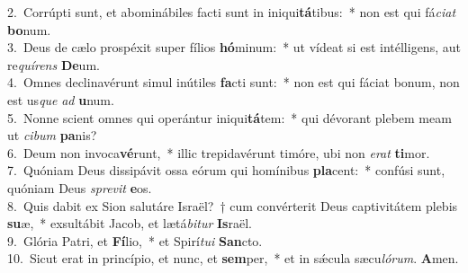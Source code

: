 {2.~}Corrúpti sunt, et abominábiles facti sunt in iniqui\textbf{tá}tibus:~* non est qui fá\textit{ci}\textit{at} \textbf{bo}num.\\
{3.~}Deus de cælo prospéxit super fílios \textbf{hó}minum:~* ut vídeat si est intélligens, aut re\textit{quí}\textit{rens} \textbf{De}um.\\
{4.~}Omnes declinavérunt simul inútiles \textbf{fa}cti sunt:~* non est qui fáciat bonum, non est us\textit{que} \textit{ad} \textbf{u}num.\\
{5.~}Nonne scient omnes qui operántur iniqui\textbf{tá}tem:~* qui dévorant plebem meam ut \textit{ci}\textit{bum} \textbf{pa}nis?\\
{6.~}Deum non invoca\textbf{vé}runt,~* illic trepidavérunt timóre, ubi non \textit{e}\textit{rat} \textbf{ti}mor.\\
{7.~}Quóniam Deus dissipávit ossa eórum qui homínibus \textbf{pla}cent:~* confúsi sunt, quóniam Deus \textit{spre}\textit{vit} \textbf{e}os.\\
{8.~}Quis dabit ex Sion salutáre Israël?~† cum convérterit Deus captivitátem plebis \textbf{su}æ,~* exsultábit Jacob, et lætá\textit{bi}\textit{tur} \textbf{Is}raël.\\
{9.~}Glória Patri, et \textbf{Fí}lio,~* et Spirí\textit{tu}\textit{i} \textbf{San}cto.\\
{10.~}Sicut erat in princípio, et nunc, et \textbf{sem}per,~* et in sǽcula sæcu\textit{ló}\textit{rum}. \textbf{A}men.\\
